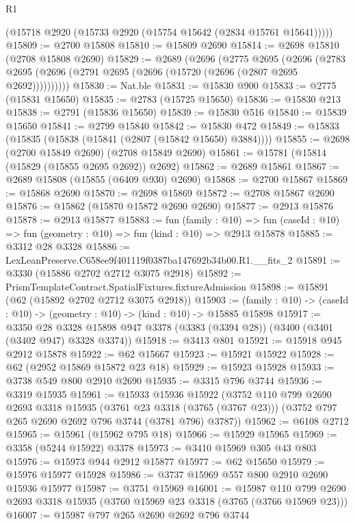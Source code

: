 \begin{lexlean}{R1}
\begin{coremodule}
      (@15718 @2920 (@15733 @2920 (@15754 @15642 (@2834 @15761 @15641)))))
@15809 := @2700 @15808
@15810 := @15809 @2690
@15814 := @2698 @15810 (@2708 @15808 @2690)
@15829 := @2689
    (@2696
      (@2775
        @2695
        (@2696 (@2783 @2695 (@2696 (@2791 @2695 (@2696 (@15720 (@2696 (@2807 @2695 @2692))))))))))
@15830 := Nat.ble
@15831 := @15830 @900
@15833 := @2775 (@15831 @15650)
@15835 := @2783 (@15725 @15650)
@15836 := @15830 @213
@15838 := @2791 (@15836 @15650)
@15839 := @15830 @516
@15840 := @15839 @15650
@15841 := @2799 @15840
@15842 := @15830 @472
@15849 := @15833 (@15835 (@15838 (@15841 (@2807 (@15842 @15650) @3884))))
@15855 := @2698 (@2700 @15849 @2690) (@2708 @15849 @2690)
@15861 := @15781 (@15814 (@15829 (@15855 @2695 @2692)) @2692)
@15862 := @2689 @15861
@15867 := @2689 @15808 (@15855 (@6409 @930) @2690)
@15868 := @2700 @15867
@15869 := @15868 @2690
@15870 := @2698 @15869
@15872 := @2708 @15867 @2690
@15876 := @15862 (@15870 @15872 @2690 @2690)
@15877 := @2913 @15876
@15878 := @2913 @15877
@15883 := fun (family : @10) =>
  fun (caseId : @10) => fun (geometry : @10) => fun (kind : @10) => @2913 @15878
@15885 := @3312 @28 @3328
@15886 := LexLeanPreserve.C658ee9f401119f0387ba147692b34b00.R1.__fits_2
@15891 := @3330 (@15886 @2702 @2712 @3075 @2918)
@15892 := PrismTemplateContract.SpatialFixtures.fixtureAdmission
@15898 := @15891 (@62 (@15892 @2702 @2712 @3075 @2918))
@15903 := (family : @10) -> (caseId : @10) -> (geometry : @10) -> (kind : @10) -> @15885 @15898
@15917 := @3350
    @28
    @3328
    @15898
    @947
    @3378
    (@3383 (@3394 @28))
    (@3400 (@3401 (@3402 @947) @3328 @3374))
@15918 := @3413 @801
@15921 := @15918 @945 @2912 @15878
@15922 := @62 @15667
@15923 := @15921 @15922
@15928 := @62 (@2952 @15869 @15872 @23 @18)
@15929 := @15923 @15928
@15933 := @3738 @549 @800 @2910 @2690
@15935 := @3315 @796 @3744
@15936 := @3319 @15935
@15961 := @15933
    @15936
    @15922
    (@3752
      @110
      @799
      @2690
      @2693
      @3318
      @15935
      (@3761 @23 @3318 (@3765 (@3767 @23)))
      (@3752 @797 @265 @2690 @2692 @796 @3744 (@3781 @796) @3787))
@15962 := @6108 @2712
@15965 := @15961 (@15962 @795 @18)
@15966 := @15929 @15965
@15969 := @3358 (@5244 @15922) @3378
@15973 := @3410 @15969 @305 @43 @803
@15976 := @15973 @944 @2912 @15877
@15977 := @62 @15650
@15979 := @15976 @15977 @15928
@15986 := @3737 @15969 @557 @800 @2910 @2690 @15936 @15977
@15987 := @3751 @15969
@16001 := @15987
    @110
    @799
    @2690
    @2693
    @3318
    @15935
    (@3760 @15969 @23 @3318 (@3765 (@3766 @15969 @23)))
@16007 := @15987 @797 @265 @2690 @2692 @796 @3744

\end{coremodule}
\end{lexlean}
